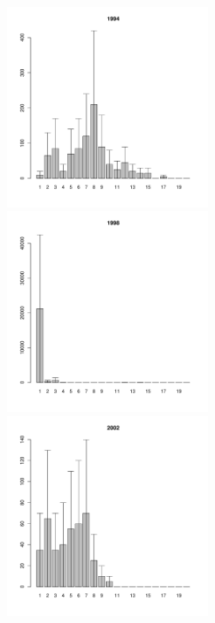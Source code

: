 \documentclass[12pt, a4paper]{article}
\begin{document}
\begin{figure}[h]
\begin{multicols}{3}
\hfill
\includegraphics[width=60mm]{../White_Sea/Luvenga_Goreliy/midlow_1994_.pdf}
\hfill
\includegraphics[width=60mm]{../White_Sea/Luvenga_Goreliy/midlow_1998_.pdf}
\hfill
\includegraphics[width=60mm]{../White_Sea/Luvenga_Goreliy/midlow_2002_.pdf}
\end{multicols}



\end{figure}
\end{document}
